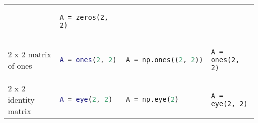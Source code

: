 \begin{tabular}[]{@{}llll@{}}
\begin{minipage}[t]{0.25\columnwidth}
\end{minipage} & \begin{minipage}[t]{0.20\columnwidth}\raggedright
\begin{lstlisting}
A = zeros(2, 2)
\end{lstlisting}

\end{minipage}\tabularnewline
\begin{minipage}[t]{0.24\columnwidth}\raggedright
2 x 2 matrix of ones
\end{minipage} & \begin{minipage}[t]{0.20\columnwidth}\raggedright
\begin{lstlisting}[language=Matlab]
A = ones(2, 2)
\end{lstlisting}

\end{minipage} & \begin{minipage}[t]{0.25\columnwidth}\raggedright
\begin{lstlisting}[language=Python]
A = np.ones((2, 2))
\end{lstlisting}

\end{minipage} & \begin{minipage}[t]{0.20\columnwidth}\raggedright
\begin{lstlisting}
A = ones(2, 2)
\end{lstlisting}

\end{minipage}\tabularnewline
\begin{minipage}[t]{0.24\columnwidth}\raggedright
2 x 2 identity matrix
\end{minipage} & \begin{minipage}[t]{0.20\columnwidth}\raggedright
\begin{lstlisting}[language=Matlab]
A = eye(2, 2)
\end{lstlisting}

\end{minipage} & \begin{minipage}[t]{0.25\columnwidth}\raggedright
\begin{lstlisting}[language=Python]
A = np.eye(2)
\end{lstlisting}

\end{minipage} & \begin{minipage}[t]{0.20\columnwidth}\raggedright
\begin{lstlisting}
A = eye(2, 2)
\end{lstlisting}


\end{minipage}
\end{tabular}
